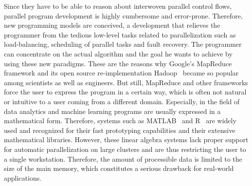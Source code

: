 Since they have to be able to reason about interwoven parallel control flows, parallel program development is highly cumbersome and error-prone.
Therefore, new programming models are conceived, a development that relieves the programmer from the tedious low-level tasks related to parallelization such as load-balancing, scheduling of parallel tasks and fault recovery.
The programmer can concentrate on the actual algorithm and the goal he wants to achieve by using these new paradigms. These are the reasons why Google's MapReduce~\cite{dean:c2008a} framework and its open source re-implementation Hadoop~\cite{hadoop:2008a} became so popular among scientists as well as engineers.
But still, MapReduce and other frameworks force the user to express the program in a certain way, which is often not natural or intuitive to a user coming from a different domain.
Especially, in the field of data analytics and machine learning programs are usually expressed in a mathematical form.
Therefore, systems such as MATLAB~\cite{matlab} and R~\cite{r:1993a} are widely used and recognized for their fast prototyping capabilities and their extensive mathematical libraries.
However, these linear algebra systems lack proper support for automatic parallelization on large clusters and are thus restricting the user to a single workstation.
Therefore, the amount of processible data is limited to the size of the main memory, which constitutes a serious drawback for real-world applications.

